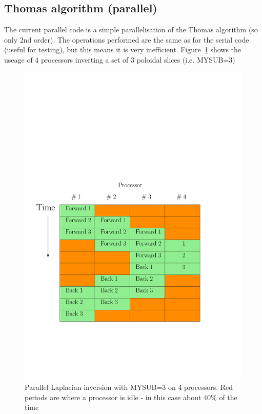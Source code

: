 \documentclass[12pt]{article}
\begin{document}
\subsection{Thomas algorithm (parallel)}

The current parallel code is a simple parallelisation of the Thomas algorithm
(so only 2nd order). The operations performed are the same as for the
serial code (useful for testing), but this means it is very inefficient.
Figure~\ref{fig:par_laplace} shows the useage of 4 processors inverting a set of 3 poloidal slices
(i.e. MYSUB=3)
\begin{figure}[htbp!]
\centering
\includegraphics[width=0.5\paperwidth, keepaspectratio]{figs/par_laplace.pdf}
\caption{Parallel Laplacian inversion with MYSUB=3 on 4 processors. Red periods are where a processor is idle - in this case about 40\% of the time}
\label{fig:par_laplace}
\end{figure}
\end{document}

